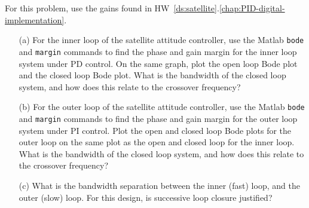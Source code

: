 
For this problem, use the gains found in HW~\ref{ds:satellite}.\ref{chap:PID-digital-implementation}.
\begin{itemize} \item[]
\item[(a)]  For the inner loop of the satellite attitude controller, use the Matlab \texttt{bode} and \texttt{margin} commands to find the phase and gain margin for the inner loop system under PD control.  On the same graph, plot the open loop Bode plot and the closed loop Bode plot. What is the bandwidth of the closed loop system, and how does this relate to the crossover frequency?

\item[(b)]  For the outer loop of the satellite attitude controller, use the Matlab \texttt{bode} and \texttt{margin} commands to find the phase and gain margin for the outer loop system under PI control.  Plot the open and closed loop Bode plots for the outer loop on the same plot as the open and closed loop for the inner loop.  What is the bandwidth of the closed loop system, and how does this relate to the crossover frequency?

\item[(c)]  What is the bandwidth separation between the inner (fast) loop, and the outer (slow) loop.  For this design, is successive loop closure justified?
\end{itemize}
